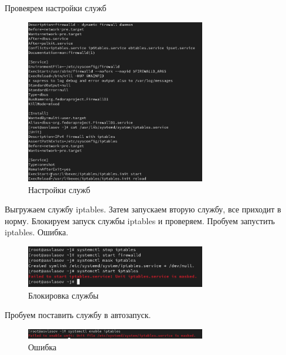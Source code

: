 \documentclass[
  12pt,
  a4paper,
  DIV=11,
  numbers=noendperiod]{scrreprt}
\begin{document}
Провеярем настройки служб

\begin{figure}

{\centering \includegraphics[width=0.7\textwidth,height=\textheight]{image/8.png}

}

\caption{Настройки служб}

\end{figure}%

Выгружаем службу iptables. Затем запускаем вторую службу, все приходит в
норму. Блокируем запуск службы iptables и проверяем. Пробуем запустить
iptables. Ошибка.

\begin{figure}

{\centering \includegraphics[width=0.7\textwidth,height=\textheight]{image/9.png}

}

\caption{Блокировка службы}

\end{figure}%

Пробуем поставить службу в автозапуск.

\begin{figure}

{\centering \includegraphics[width=0.7\textwidth,height=\textheight]{image/10.png}

}

\caption{Ошибка}

\end{figure}%
\end{document}
